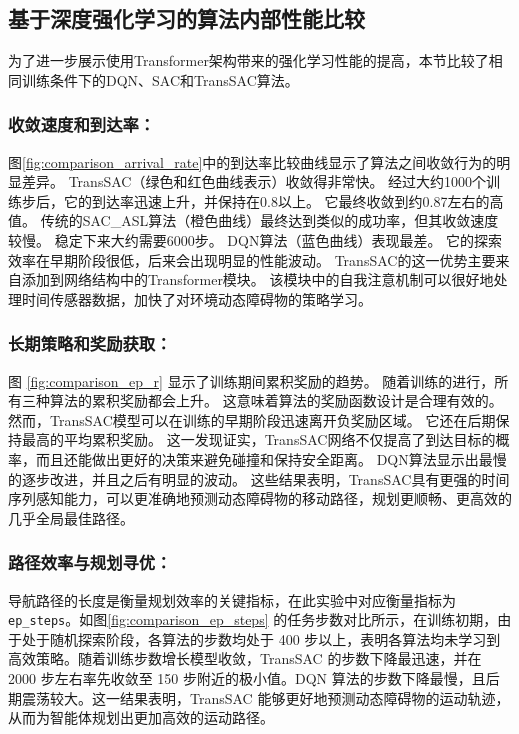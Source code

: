 \subsection{基于深度强化学习的算法内部性能比较}
为了进一步展示使用Transformer架构带来的强化学习性能的提高，本节比较了相同训练条件下的DQN、SAC和TransSAC算法。

\subsubsection{收敛速度和到达率：}

图\ref{fig:comparison_arrival_rate}中的到达率比较曲线显示了算法之间收敛行为的明显差异。 TransSAC（绿色和红色曲线表示）收敛得非常快。 经过大约1000个训练步后，它的到达率迅速上升，并保持在0.8以上。 它最终收敛到约0.87左右的高值。 传统的SAC\_ASL算法（橙色曲线）最终达到类似的成功率，但其收敛速度较慢。 稳定下来大约需要6000步。 DQN算法（蓝色曲线）表现最差。 它的探索效率在早期阶段很低，后来会出现明显的性能波动。 TransSAC的这一优势主要来自添加到网络结构中的Transformer模块。 该模块中的自我注意机制可以很好地处理时间传感器数据，加快了对环境动态障碍物的策略学习。

\subsubsection{长期策略和奖励获取：}
图 \ref{fig:comparison_ep_r} 显示了训练期间累积奖励的趋势。 随着训练的进行，所有三种算法的累积奖励都会上升。 这意味着算法的奖励函数设计是合理有效的。 然而，TransSAC模型可以在训练的早期阶段迅速离开负奖励区域。 它还在后期保持最高的平均累积奖励。 这一发现证实，TransSAC网络不仅提高了到达目标的概率，而且还能做出更好的决策来避免碰撞和保持安全距离。 DQN算法显示出最慢的逐步改进，并且之后有明显的波动。 这些结果表明，TransSAC具有更强的时间序列感知能力，可以更准确地预测动态障碍物的移动路径，规划更顺畅、更高效的几乎全局最佳路径。

\subsubsection{路径效率与规划寻优：} 导航路径的长度是衡量规划效率的关键指标，在此实验中对应衡量指标为\texttt{ep\_steps}。如图\ref{fig:comparison_ep_steps} 的任务步数对比所示，在训练初期，由于处于随机探索阶段，各算法的步数均处于 400 步以上，表明各算法均未学习到高效策略。随着训练步数增长模型收敛，TransSAC 的步数下降最迅速，并在 2000 步左右率先收敛至 150 步附近的极小值。DQN 算法的步数下降最慢，且后期震荡较大。这一结果表明，TransSAC 能够更好地预测动态障碍物的运动轨迹，从而为智能体规划出更加高效的运动路径。

